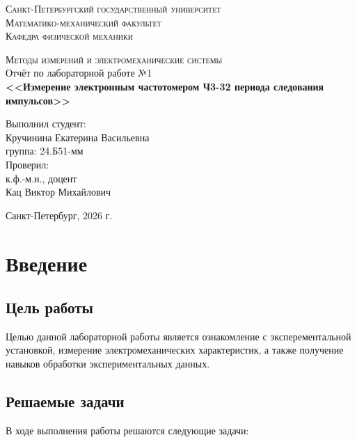 \documentclass[a4paper,14pt]{extarticle}
\begin{document}
\begin{titlepage}
\begin{center}
\textsc{Санкт-Петербургский государственный университет\\
Математико-механический факультет\\
Кафедра физической механики\\}

\vfill

\textsc{Методы измерений и электромеханические системы\\[3mm]}
Отчёт по лабораторной работе №1\\[6mm]


\textbf{\large<<Измерение электронным частотомером Ч3-32 периода
следования импульсов>>}

\vfill
\end{center}

\hfill
\begin{minipage}{.5\textwidth}
Выполнил студент:\\[2mm] 
Кручинина Екатерина Васильевна\\
группа: 24.Б51-мм\\[5mm]

Проверил:\\[2mm] 
к.ф.-м.н., доцент\\
Кац Виктор Михайлович
\end{minipage}%
\vfill
\begin{center}
 Санкт-Петербург, 2026 г.
\end{center}
\end{titlepage}


\tableofcontents
\newpage

\section{Введение}

\subsection{Цель работы}
Целью данной лабораторной работы является ознакомление с эксперементальной установкой, измерение электромеханических характеристик, а также получение навыков обработки экспериментальных данных.

\subsection{Решаемые задачи}

В ходе выполнения работы решаются следующие задачи:
\end{document}
